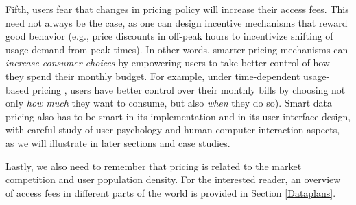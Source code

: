 
Fifth, users fear that changes in pricing policy will increase their access fees. This need not always be the case, as one can design incentive mechanisms that reward good behavior (e.g., price discounts in off-peak hours to incentivize shifting of usage demand from peak times). In other words, smarter pricing mechanisms can \emph{increase consumer choices} by empowering users to take better control of how they spend their monthly budget. For example, under time-dependent usage-based pricing \cite{comm-mag,ha2012tube}, users have better control over their monthly bills by choosing not only \emph{how much} they want to consume, but also \emph{when} they do so). Smart data pricing also has to be smart in its implementation and in its user interface design, with careful study of user psychology and human-computer interaction aspects, as we will illustrate in later sections and case studies. 

Lastly, we also need to remember that pricing is related to the market competition and user population density. For the interested reader, an overview of access fees in different parts of the world is provided in Section \ref{Dataplans}.

